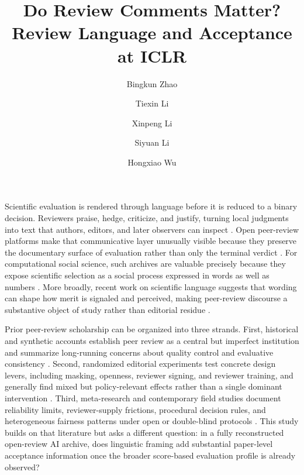 \documentclass[9pt,twocolumn]{pnas-new}
\title{Do Review Comments Matter? Review Language and Acceptance at ICLR}
\author[a]{Bingkun Zhao}
\author[a]{Tiexin Li}
\author[a]{Xinpeng Li}
\author[a]{Siyuan Li}
\author[a]{Hongxiao Wu}
\affil[a]{Department of Data Science, City University of Hong Kong, Hong Kong SAR}
\begin{document}
\maketitle
\thispagestyle{firststyle}
\pagestyle{plain}

Scientific evaluation is rendered through language before it is reduced to a binary decision. Reviewers praise, hedge, criticize, and justify, turning local judgments into text that authors, editors, and later observers can inspect \cite{walker2015peerreview,tennant2017innovations}. Open peer-review platforms make that communicative layer unusually visible because they preserve the documentary surface of evaluation rather than only the terminal verdict \cite{openreview2026iclr}. For computational social science, such archives are valuable precisely because they expose scientific selection as a social process expressed in words as well as numbers \cite{lazer2009computational}. More broadly, recent work on scientific language suggests that wording can shape how merit is signaled and perceived, making peer-review discourse a substantive object of study rather than editorial residue \cite{stavrova2025promotional}.

Prior peer-review scholarship can be organized into three strands. First, historical and synthetic accounts establish peer review as a central but imperfect institution and summarize long-running concerns about quality control and evaluative consistency \cite{spier2002history,smith2006flawed,jefferson2002effects,bornmann2011scientific}. Second, randomized editorial experiments test concrete design levers, including masking, openness, reviewer signing, and reviewer training, and generally find mixed but policy-relevant effects rather than a single dominant intervention \cite{vanrooyen1998blinding,godlee1998signing,justice1998masking,black1998goodreviewer,vanrooyen1999open,schroter2004training}. Third, meta-research and contemporary field studies document reliability limits, reviewer-supply frictions, procedural decision rules, and heterogeneous fairness patterns under open or double-blind protocols \cite{bornmann2010reliability,bornmann2010manuscript,tite2007decline,rosshellauer2017open,bravo2019effect,tomkins2017reviewerbias,sun2022doubleblind,budden2008doubleblind,squazzoni2021gender,helmer2017gender}. This study builds on that literature but asks a different question: in a fully reconstructed open-review AI archive, does linguistic framing add substantial paper-level acceptance information once the broader score-based evaluation profile is already observed?
\end{document}
